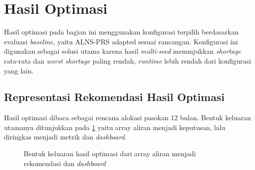 \documentclass{file/TA-ITS}
\theoremstyle{definition}
\theoremstyle{definition}
\theoremstyle{plain}
\begin{document}
\section{Hasil Optimasi}

Hasil optimasi pada bagian ini menggunakan konfigurasi terpilih berdasarkan evaluasi \textit{baseline}, yaitu ALNS-PRS adapted sesuai rancangan. Konfigurasi ini digunakan sebagai solusi utama karena hasil \textit{multi-seed} menunjukkan \textit{shortage} rata-rata dan \textit{worst shortage} paling rendah, \textit{runtime} lebih rendah dari konfigurasi yang lain.

\subsection{Representasi Rekomendasi Hasil Optimasi}

Hasil optimasi dibaca sebagai rencana alokasi pasokan 12 bulan. Bentuk keluaran utamanya ditunjukkan pada \ref{fig:hasil_to_dashboard_flow} yaitu array aliran menjadi keputusan, lalu diringkas menjadi metrik dan \textit{dashboard}.

\begin{figure}[H]
\centering
{}
\caption{Bentuk keluaran hasil optimasi dari array aliran menjadi rekomendasi dan \textit{dashboard}}
\label{fig:hasil_to_dashboard_flow}
\end{figure}
\end{document}

